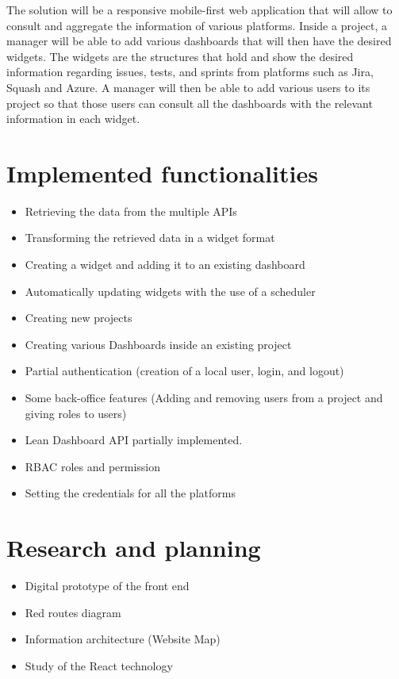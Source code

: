 \documentclass[a4paper,twoside,10pt]{report}
\begin{document}
The solution will be a responsive mobile-first web application that will allow to consult and aggregate the information of various platforms. Inside a project, a manager will be able to add various dashboards that will then have the desired widgets. The widgets are the structures that hold and show the desired information regarding issues, tests, and sprints from platforms such as Jira, Squash and Azure. A manager will then be able to add various users to its project so that those users can consult all the dashboards with the relevant information in each widget.
\section{Implemented functionalities}
\begin{itemize}
    \item Retrieving the data from the multiple APIs
    \item Transforming the retrieved data in a widget format
    \item Creating a widget and adding it to an existing dashboard
    \item Automatically updating widgets with the use of a scheduler
    \item Creating new projects
    \item Creating various Dashboards inside an existing project
    \item Partial authentication (creation of a local user, login, and logout)
    \item Some back-office features (Adding and removing users from a project and giving roles to users)
    \item Lean Dashboard API partially implemented.
    \item RBAC roles and permission
    \item Setting the credentials for all the platforms
\end{itemize}

\newpage
\section{Research and planning}
\begin{itemize}
    \item Digital prototype of the front end
    \item Red routes diagram
    \item Information architecture (Website Map)
    \item Study of the React technology
\end{itemize}
\end{document}
